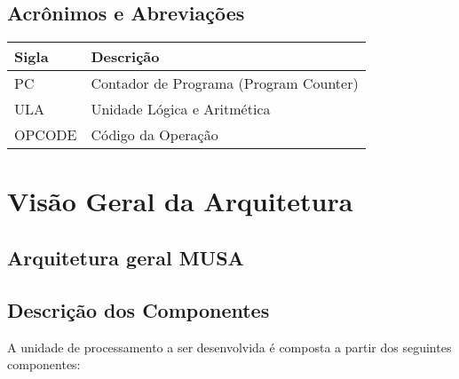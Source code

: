 \documentclass{report}
\begin{document}
  \section{Acrônimos e Abreviações}
    \FloatBarrier
    \begin{table}[H]
      \begin{center}
        \begin{tabular}[pos]{|m{2cm} | m{12cm}|} 
          \hline
          \cellcolor[gray]{0.9}\textbf{Sigla} & \cellcolor[gray]{0.9}\textbf{Descrição} \\ \hline
             PC       &  Contador de Programa (Program Counter)\\ \hline
             ULA      &  Unidade Lógica e Aritmética\\ \hline
             OPCODE   &  Código da Operação\\ \hline
        \end{tabular}
      \end{center}
    \end{table}  

\chapter{Visão Geral da Arquitetura}
  \section{Arquitetura geral MUSA}
  \begin{figure}[H]
	\centering
	
  \end{figure}  

  \section{Descrição dos Componentes}
  A unidade de processamento a ser desenvolvida é composta a partir dos seguintes componentes:
  
\end{document}
